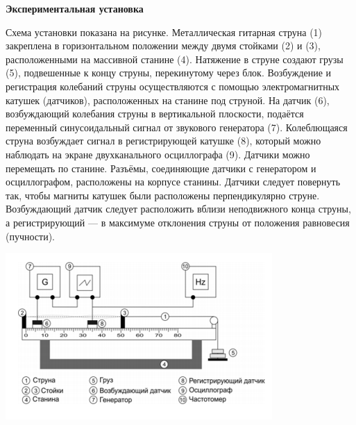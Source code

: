 \documentclass[12pt]{article}
\begin{document}
	\begin{center}
		\textbf{Экспериментальная установка}
	\end{center}
	Схема установки показана на рисунке. Металлическая гитарная струна
	(1) закреплена в горизонтальном положении между двумя стойками (2)
	и (3), расположенными на массивной станине (4). Натяжение в струне создают грузы (5), подвешенные к концу струны, перекинутому через блок.
	Возбуждение и регистрация колебаний струны осуществляются с помощью электромагнитных катушек (датчиков), расположенных на станине
	под струной. На датчик (6), возбуждающий колебания струны в вертикальной плоскости, подаётся переменный синусоидальный сигнал от звукового генератора (7). Колеблющаяся струна возбуждает сигнал в регистрирующей катушке (8), который можно наблюдать на экране двухканального осциллографа (9). Датчики можно перемещать по станине. Разъёмы, соединяющие датчики с генератором и осциллографом, расположены
	на корпусе станины. Датчики следует повернуть так, чтобы магниты катушек были расположены перпендикулярно струне. Возбуждающий датчик
	следует расположить вблизи неподвижного конца струны, а регистрирующий — в максимуме отклонения струны от положения равновесия (пучности).
	\begin{center}
		\includegraphics[width=4in]{5_1.png}
	\end{center}
	
\end{document}
